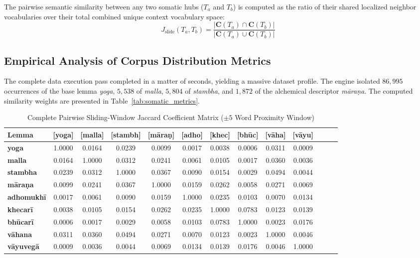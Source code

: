 \documentclass[11pt,twoside,letterpaper]{article}
\begin{document}
The pairwise semantic similarity between any two somatic hubs ($T_a$ and $T_b$) is computed as the ratio of their shared localized neighbor vocabularies over their total combined unique context vocabulary space:
\begin{equation}
J_{\text{slide}}(T_a, T_b) = \frac{\vert \mathbf{C}(T_a) \cap \mathbf{C}(T_b) \vert}{\vert \mathbf{C}(T_a) \cup \mathbf{C}(T_b) \vert}
\end{equation}

\subsection{Empirical Analysis of Corpus Distribution Metrics}
The complete data execution pass completed in a matter of seconds, yielding a massive dataset profile. The engine isolated $86,995$ occurrences of the base lemma \textit{yoga}, $5,538$ of \textit{malla}, $5,804$ of \textit{stambha}, and $1,872$ of the alchemical descriptor \textit{māraṇa}. The computed similarity weights are presented in Table~\ref{tab:somatic_metrics}.

\begin{table}[htbp]
\centering
\caption{Complete Pairwise Sliding-Window Jaccard Coefficient Matrix ($\pm 5$ Word Proximity Window)}
\label{tab:somatic_metrics_full}
\scriptsize
\setlength{\tabcolsep}{3pt}
\begin{tabular}{lcccccccccccc}
\hline
\textbf{Lemma} & \textbf{[yoga]} & \textbf{[malla]} & \textbf{[stambh]} & \textbf{[māraṇ]} & \textbf{[adho]} & \textbf{[khec]} & \textbf{[bhūc]} & \textbf{[vāha]} & \textbf{[vāyu]} \\ \hline
\textbf{yoga}     & 1.0000 & 0.0164 & 0.0239 & 0.0099 & 0.0017 & 0.0038 & 0.0006 & 0.0311 & 0.0009 \\
\textbf{malla}    & 0.0164 & 1.0000 & 0.0312 & 0.0241 & 0.0061 & 0.0105 & 0.0017 & 0.0360 & 0.0036 \\
\textbf{stambha}  & 0.0239 & 0.0312 & 1.0000 & 0.0367 & 0.0090 & 0.0154 & 0.0029 & 0.0494 & 0.0044 \\
\textbf{māraṇa}   & 0.0099 & 0.0241 & 0.0367 & 1.0000 & 0.0159 & 0.0262 & 0.0058 & 0.0271 & 0.0069 \\
\textbf{adhomukhī}& 0.0017 & 0.0061 & 0.0090 & 0.0159 & 1.0000 & 0.0235 & 0.0103 & 0.0070 & 0.0134 \\
\textbf{khecarī}  & 0.0038 & 0.0105 & 0.0154 & 0.0262 & 0.0235 & 1.0000 & 0.0783 & 0.0123 & 0.0139 \\
\textbf{bhūcarī}  & 0.0006 & 0.0017 & 0.0029 & 0.0058 & 0.0103 & 0.0783 & 1.0000 & 0.0023 & 0.0176 \\
\textbf{vāhana}   & 0.0311 & 0.0360 & 0.0494 & 0.0271 & 0.0070 & 0.0123 & 0.0023 & 1.0000 & 0.0046 \\
\textbf{vāyuvegā} & 0.0009 & 0.0036 & 0.0044 & 0.0069 & 0.0134 & 0.0139 & 0.0176 & 0.0046 & 1.0000 \\ \hline
\end{tabular}
\end{table}
\end{document}
